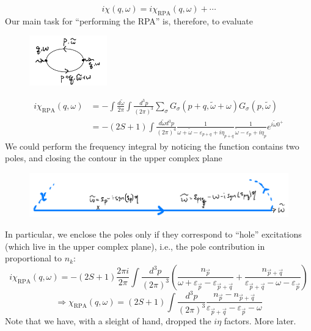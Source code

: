 \[ i\chi \left( q,\omega \right) =i\chi _{\mathrm{RPA}}\left( q,\omega \right) +\cdots \]
Our main task for ``performing the RPA'' is, therefore, to evaluate
\begin{figure}[H]
    \centering
    \includegraphics[width=0.3\textwidth]{jupyterbook/data/fig/lec20-fig03.png}
\end{figure}
\begin{align*}
    i\chi _{\mathrm{RPA}}\left( q,\omega \right) &=-\int{\frac{d\tilde{\omega}}{2\pi}\int{\frac{d^3p}{\left( 2\pi \right) ^3}\sum_{\sigma}{G_{\sigma}\left( p+q,\tilde{\omega}+\omega \right) G_{\sigma}\left( p,\tilde{\omega} \right)}}}\\
    &=-\left( 2S+1 \right) \int{\frac{d\tilde{\omega}d^3p}{\left( 2\pi \right) ^4}\frac{1}{\omega +\tilde{\omega}-\varepsilon _{p+q}+i\eta _{p+q}}\frac{1}{\tilde{\omega}-\varepsilon _p+i\eta _p}e^{i\tilde{\omega}0^+}}
\end{align*}
We could perform the frequency integral by noticing the function contains two poles, and closing the contour in the upper complex plane
\begin{figure}[H]
    \centering
    \includegraphics[width=\textwidth]{jupyterbook/data/fig/lec20-fig04.png}
\end{figure}
In particular, we enclose the poles only if they correspond to ``hole'' excitations (which live in the upper complex plane), i.e., the pole contribution in proportional to $n_k$:
\[ i\chi _{\mathrm{RPA}}\left( q,\omega \right) =-\left( 2S+1 \right) \frac{2\pi i}{2\pi}\int{\frac{d^3p}{\left( 2\pi \right) ^3}\left( \frac{n_{\vec{p}}}{\omega +\varepsilon _{\vec{p}}-\varepsilon _{\vec{p}+\vec{q}}}+\frac{n_{\vec{p}+\vec{q}}}{\varepsilon _{\vec{p}+\vec{q}}-\omega -\varepsilon _{\vec{p}}} \right)}\]
\[ \Rightarrow \chi _{\mathrm{RPA}}\left( q,\omega \right) =\left( 2S+1 \right) \int{\frac{d^3p}{\left( 2\pi \right) ^3}\frac{n_{\vec{p}}-n_{\vec{p}+\vec{q}}}{\varepsilon _{\vec{p}+\vec{q}}-\varepsilon _{\vec{p}}-\omega}}\]
Note that we have, with a sleight of hand, dropped the $i\eta$ factors. More later.

